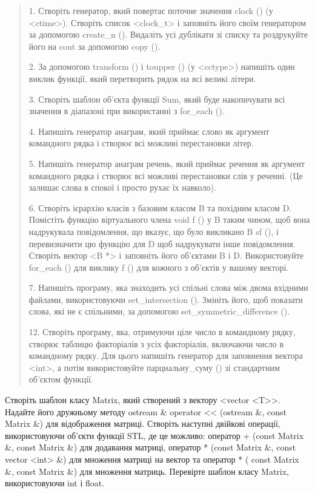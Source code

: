 \documentclass[]{article}
\begin{document}
\begin{quote}
1. Створіть генератор, який повертає поточне значення clock () (у
\textless{}ctime\textgreater{}). Створіть список
\textless{}clock\_t\textgreater{} і заповніть його своїм генератором за
допомогою create\_n (). Видаліть усі дублікати зі списку та роздрукуйте
його на cout за допомогою copy ().

2. За допомогою transform () і toupper () (у
\textless{}cctype\textgreater{}) напишіть один виклик функції, який
перетворить рядок на всі великі літери.

3. Створіть шаблон об'єкта функції Sum, який буде накопичувати всі
значення в діапазоні при використанні з for\_each ().

4. Напишіть генератор анаграм, який приймає слово як аргумент командного
рядка і створює всі можливі перестановки літер.

5. Напишіть генератор анаграм речень, який приймає речення як аргумент
командного рядка і створює всі можливі перестановки слів у реченні. (Це
залишає слова в спокої і просто рухає їх навколо).

6. Створіть ієрархію класів з базовим класом B та похідним класом D.
Помістіть функцію віртуального члена void f () у B таким чином, щоб вона
надрукувала повідомлення, що вказує, що було викликано B sf (), і
перевизначити цю функцію для D щоб надрукувати інше повідомлення.
Створіть вектор \textless{}B *\textgreater{} і заповніть його об'єктами
B і D. Використовуйте for\_each () для виклику f () для кожного з
об'єктів у вашому векторі.

7. Напишіть програму, яка знаходить усі спільні слова між двома вхідними
файлами, використовуючи set\_intersection (). Змініть його, щоб показати
слова, які не є спільними, за допомогою set\_symmetric\_difference ().

12. Створіть програму, яка, отримуючи ціле число в командному рядку,
створює таблицю факторіалів з усіх факторіалів, включаючи число в
командному рядку. Для цього напишіть генератор для заповнення вектора
\textless{}int\textgreater{}, а потім використовуйте парциальну\_суму ()
зі стандартним об'єктом функції.
\end{quote}

Створіть шаблон класу Matrix, який створений з вектору \textless{}vector
\textless{}T\textgreater{}\textgreater{}. Надайте його дружньому методу
ostream \& operator \textless{}\textless{} (ostream \&, const Matrix \&)
для відображення матриці. Створіть наступні двійкові операції,
використовуючи об'єкти функції STL, де це можливо: оператор + (const
Matrix \&, const Matrix \&) для додавання матриці, оператор * (const
Matrix \&, const vector \textless{}int\textgreater{} \&) для множення
матриці на вектор та оператор * ( const Matrix \&, const Matrix \&) для
множення матриць. Перевірте шаблон класу Matrix, використовуючи int і
float.
\end{document}
